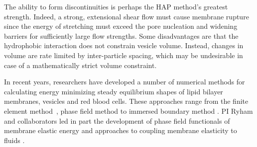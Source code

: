 The ability to form discontinuities is perhaps the HAP method's greatest 
strength. Indeed, a strong, extensional shear flow must cause membrane rupture since the 
energy of stretching must exceed the pore nucleation and widening barriers 
for sufficiently large flow strengths. 
Some disadvantages are that the hydrophobic interaction does not constrain vesicle volume. 
Instead, changes in volume are rate limited by inter-particle spacing,
which may be undesirable in case of a mathematically strict volume constraint.

In recent years, researchers have developed a number of numerical methods for calculating
energy minimizing steady equilibrium shapes of lipid bilayer membranes, vesicles and red blood cells.
These approaches range from the finite element method~\cite{Bartels,Peng13,RyKlYaCo16,Sinha15}, 
phase field method \cite{Du05,QiangDu08,Lowengrub13} to immersed boundary method  \cite{Hu,Hu13, Kim10}.
PI Ryham and collaborators led in part the development of phase field
functionals of membrane elastic energy and approaches to coupling membrane elasticity to fluids  \cite{0951-7715-18-3-016,Du05,DuEuler,QiangDu09}.


